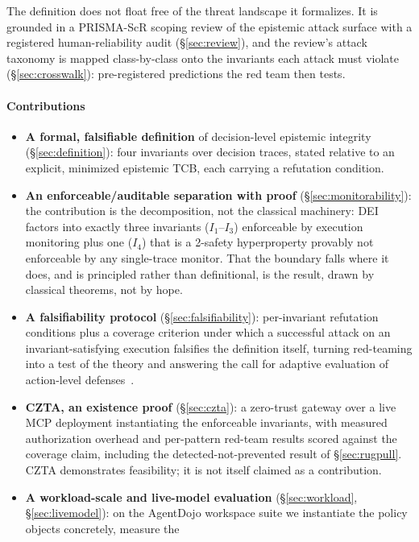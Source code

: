 \documentclass[conference]{IEEEtran}
\newcommand{\Ione}{\ensuremath{I_1}}
\newcommand{\Ithree}{\ensuremath{I_3}}
\newcommand{\Ifour}{\ensuremath{I_4}}
\begin{document}
The definition does not float free of the threat landscape it
formalizes. It is grounded in a PRISMA-ScR scoping review of the
epistemic attack surface with a registered human-reliability audit
(\S\ref{sec:review}), and the review's attack taxonomy is mapped
class-by-class onto the invariants each attack must violate
(\S\ref{sec:crosswalk}): pre-registered predictions the red team
then tests.

\paragraph*{Contributions}
\begin{itemize}[leftmargin=1.15em,itemsep=1pt]
\item \textbf{A formal, falsifiable definition} of decision-level
epistemic integrity (\S\ref{sec:definition}): four invariants over
decision traces, stated relative to an explicit, minimized
epistemic TCB, each carrying a refutation condition.
\item \textbf{An enforceable/auditable separation with proof}
(\S\ref{sec:monitorability}): the contribution is the
decomposition, not the classical machinery: DEI factors into
exactly three invariants (\Ione--\Ithree) enforceable by execution
monitoring plus one (\Ifour) that is a 2-safety hyperproperty
provably not enforceable by any single-trace monitor. That the
boundary falls where it does, and is principled rather than
definitional, is the result, drawn by classical theorems, not by
hope.
\item \textbf{A falsifiability protocol}
(\S\ref{sec:falsifiability}): per-invariant refutation conditions
plus a coverage criterion under which a successful attack on an
invariant-satisfying execution falsifies the definition
itself, turning red-teaming into a test of the theory and
answering the call for adaptive evaluation of action-level
defenses~\cite{oob}.
\item \textbf{CZTA, an existence proof} (\S\ref{sec:czta}): a
zero-trust gateway over a live MCP deployment instantiating the
enforceable invariants, with measured authorization overhead and
per-pattern red-team results scored against the coverage claim,
including the detected-not-prevented result of \S\ref{sec:rugpull}. CZTA
demonstrates feasibility; it is not itself claimed as a
contribution.
\item \textbf{A workload-scale and live-model evaluation}
(\S\ref{sec:workload}, \S\ref{sec:livemodel}): on the AgentDojo workspace suite we
instantiate the policy objects concretely, measure the

\end{itemize}
\end{document}
